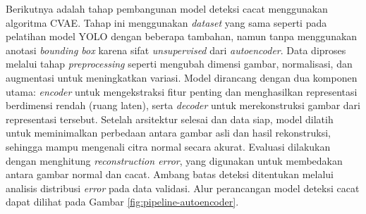 Berikutnya adalah tahap pembangunan model deteksi cacat menggunakan
algoritma CVAE. Tahap ini menggunakan
\textit{dataset} yang sama seperti pada pelatihan model YOLO dengan
beberapa tambahan, namun tanpa menggunakan anotasi \textit{bounding
box} karena sifat \textit{unsupervised} dari \textit{autoencoder}.
Data diproses melalui tahap \textit{preprocessing} seperti
mengubah dimensi gambar, normalisasi, dan augmentasi untuk
meningkatkan variasi. Model
dirancang dengan dua komponen utama: \textit{encoder} untuk
mengekstraksi fitur penting dan menghasilkan representasi berdimensi
rendah (ruang laten), serta \textit{decoder} untuk
merekonstruksi gambar dari representasi tersebut. Setelah arsitektur
selesai dan data siap, model dilatih untuk meminimalkan perbedaan
antara gambar asli dan hasil rekonstruksi, sehingga mampu mengenali
citra normal secara akurat. Evaluasi dilakukan dengan menghitung
\textit{reconstruction error}, yang digunakan untuk membedakan antara
gambar normal dan cacat. Ambang batas deteksi ditentukan melalui analisis
distribusi \textit{error} pada data validasi. Alur perancangan model
deteksi cacat dapat dilihat pada Gambar \ref{fig:pipeline-autoencoder}.


